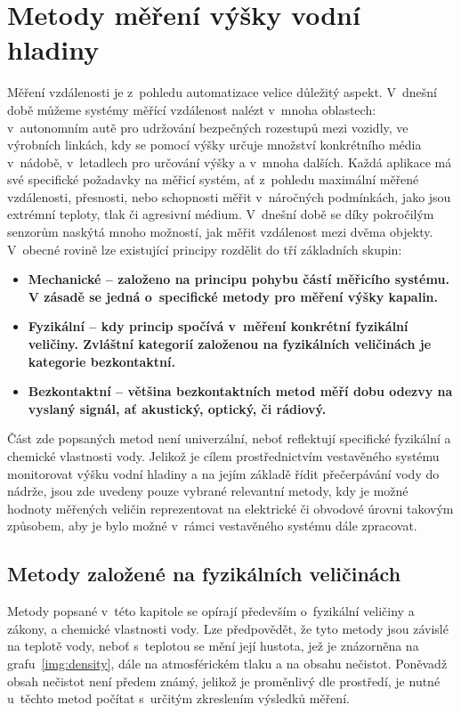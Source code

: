 \chapter{Metody měření výšky vodní hladiny}

    Měření vzdálenosti je z~pohledu automatizace velice důležitý aspekt. V~dnešní době můžeme systémy měřící vzdálenost nalézt v~mnoha oblastech: v~autonomním autě pro udržování bezpečných rozestupů mezi vozidly, ve výrobních linkách, kdy se pomocí výšky určuje množství konkrétního média v~nádobě, v~letadlech pro určování výšky a v~mnoha dalších. Každá aplikace má své specifické požadavky na měřicí systém, ať z~pohledu maximální měřené vzdálenosti, přesnosti, nebo schopnosti měřit v~náročných podmínkách, jako jsou extrémní teploty, tlak či agresivní médium.
    V~dnešní době se díky pokročilým senzorům naskýtá mnoho možností, jak měřit vzdálenost mezi dvěma objekty. V~obecné rovině lze existující principy rozdělit do tří základních skupin:
    
    \begin{itemize}
        \item \bf Mechanické \rm -- založeno na principu pohybu částí měřicího systému. V zásadě se jedná o~specifické metody pro měření výšky kapalin.
        \item \bf Fyzikální \rm -- kdy princip spočívá v~měření konkrétní fyzikální veličiny. Zvláštní kategorií založenou na fyzikálních veličinách je kategorie \bf bezkontaktní\rm.  
        \item \bf Bezkontaktní \rm -- většina bezkontaktních metod měří dobu odezvy na vyslaný signál, ať akustický, optický, či rádiový.
    \end{itemize}

    Část zde popsaných metod není univerzální, neboť reflektují specifické fyzikální a chemické vlastnosti vody. Jelikož je cílem prostřednictvím vestavěného systému monitorovat výšku vodní hladiny a na jejím základě řídit přečerpávání vody do nádrže, jsou zde uvedeny pouze vybrané relevantní metody, kdy je možné hodnoty měřených veličin reprezentovat na elektrické či obvodové úrovni takovým způsobem, aby je bylo možné v~rámci vestavěného systému dále zpracovat.

    \section{Metody založené na fyzikálních veličinách}
        Metody popsané v~této kapitole se opírají především o~fyzikální veličiny a zákony, a chemické vlastnosti vody. Lze předpovědět, že tyto metody jsou závislé na teplotě vody, neboť s~teplotou se mění její hustota, jež je znázorněna na grafu~\ref{img:density}, dále na atmosférickém tlaku a na obsahu nečistot. Poněvadž obsah nečistot není předem známý, jelikož je proměnlivý dle prostředí, je nutné u~těchto metod počítat s~určitým zkreslením výsledků měření.

